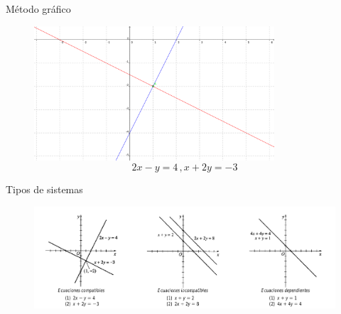 {M\'etodo gráfico}
	\begin{figure}
		\centering
		\includegraphics[height=5cm,keepaspectratio=true]{./precalculo/IM0401.png}
		\caption{$$2x-y=4\, , x+2y=-3$$}
		\label{fig:IM0401}
	\end{figure}
	


{Tipos de sistemas}
	\begin{figure}
		\centering
		\includegraphics[width=12cm,keepaspectratio=true]{./precalculo/IM0402.png}
		\label{fig:0401}
	\end{figure}
	

